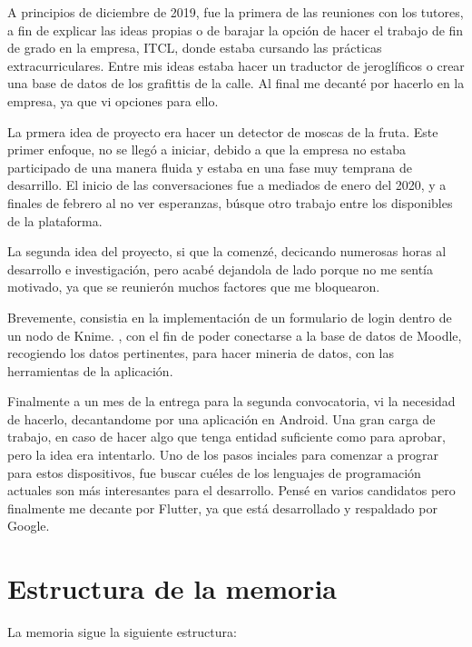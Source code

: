 
A principios de diciembre de 2019, fue la primera de las reuniones con los tutores, a fin de explicar las ideas propias o de barajar la opción de hacer el trabajo de fin de grado en la empresa, ITCL, donde estaba cursando las prácticas extracurriculares. Entre mis ideas estaba hacer un traductor de jeroglíficos o crear una base de datos de los grafittis de la calle. Al final me decanté por hacerlo en la empresa, ya que vi opciones para ello.

La prmera idea de proyecto era hacer un detector de moscas de la fruta. Este primer enfoque, no se llegó a iniciar, debido a que la empresa no estaba participado de una manera fluida y estaba en una fase muy temprana de desarrillo. El inicio de las conversaciones fue a mediados de enero del 2020, y a finales de febrero al no ver esperanzas, búsque otro trabajo entre los disponibles de la plataforma.

La segunda idea del proyecto, si que la comenzé, decicando numerosas horas al desarrollo e investigación, pero acabé dejandola de lado porque no me sentía motivado, ya que se reunierón muchos factores que me bloquearon.

Brevemente, consistia en la implementación de un formulario de login dentro de un nodo de Knime\cite{noauthor_knime_nodate}. , con el fin de poder conectarse a la base de datos de Moodle, recogiendo los datos pertinentes, para hacer mineria de datos, con las herramientas de la aplicación. 

Finalmente a un mes de la entrega para la segunda convocatoria, vi la necesidad de hacerlo, decantandome por una aplicación en Android. Una gran carga de trabajo, en caso de hacer algo que tenga entidad suficiente como para aprobar, pero la idea era intentarlo. Uno de los pasos inciales para comenzar a prograr para estos dispositivos, fue buscar cuéles de los lenguajes de programación actuales son más interesantes para el desarrollo. Pensé en varios candidatos pero finalmente me decante por Flutter, ya que está desarrollado y respaldado por Google.


\section{Estructura de la memoria}\label{estructura-de-la-memoria}

La memoria sigue la siguiente estructura:

